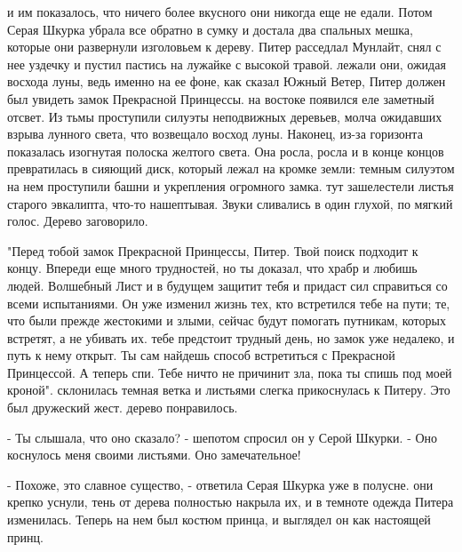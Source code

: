 и им показалось, что ничего более вкусного они никогда еще не едали. 
Потом Серая Шкурка убрала все обратно в сумку и достала два спальных 
мешка, которые они развернули изголовьем к дереву. Питер расседлал 
Мунлайт, снял с нее уздечку и пустил пастись на лужайке с высокой 
травой.
 лежали они, ожидая восхода луны, ведь именно на ее фоне, как 
сказал Южный Ветер, Питер должен был увидеть замок Прекрасной 
Принцессы.
 на востоке появился еле заметный отсвет. Из тьмы проступили 
силуэты неподвижных деревьев, молча ожидавших взрыва лунного света, 
что возвещало восход луны. Наконец, из-за горизонта показалась 
изогнутая полоска желтого света. Она росла, росла и в конце концов 
превратилась в сияющий диск, который лежал на кромке земли: темным 
силуэтом на нем проступили башни и укрепления огромного замка.
 тут зашелестели листья старого эвкалипта, что-то нашептывая. 
Звуки сливались в один глухой, по мягкий голос. Дерево заговорило.
\par"Перед тобой замок Прекрасной Принцессы, Питер. Твой поиск 
подходит к концу. Впереди еще много трудностей, но ты доказал, что 
храбр и любишь людей. Волшебный Лист и в будущем защитит тебя и 
придаст сил справиться со всеми испытаниями. Он уже изменил жизнь тех, 
кто встретился тебе на пути; те, что были прежде жестокими и злыми, 
сейчас будут помогать путникам, которых встретят, а не убивать их.
 тебе предстоит трудный день, но замок уже недалеко, и путь 
к нему открыт. Ты сам найдешь способ встретиться с Прекрасной 
Принцессой. А теперь спи. Тебе ничто не причинит зла, пока ты спишь 
под моей кроной".
 склонилась темная ветка и листьями слегка прикоснулась к 
Питеру. Это был дружеский жест.
 дерево понравилось.
\par- Ты слышала, что оно сказало? - шепотом спросил он у Серой 
Шкурки. - Оно коснулось меня своими листьями. Оно замечательное!
\par- Похоже, это славное существо, - ответила Серая Шкурка уже в 
полусне.
 они крепко уснули, тень от дерева полностью накрыла их, и в 
темноте одежда Питера изменилась. Теперь на нем был костюм принца, и 
выглядел он как настоящей принц.
